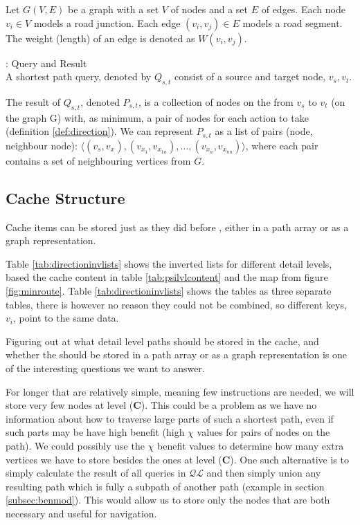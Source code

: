 \begin{definition}
Let $G(V, E)$ be a graph with a set $V$ of nodes and a set $E$ of edges.
Each node $v_i \in V$ models a road junction. Each edge $(v_i, v_j) \in
E$ models a road segment. The weight (length) of an edge is denoted as $W(v_i, v_j)$.
\end{definition}


\begin{definition}{\spathns: Query and Result}\\
A shortest path query, denoted by $Q_{s,t}$ consist of a source and target node, $v_s,v_t$.

The result of $Q_{s,t}$, denoted $P_{s,t}$, is a collection of nodes on the \spath from $v_s$ to $v_t$ (on the graph G) with, as minimum, a pair of nodes for each action to take (definition \ref{def:direction}).
We can represent $P_{s,t}$ as a list of pairs (node, neighbour node): $\langle (v_{s},v_{x_{}}), (v_{x_1},v_{x_{1n}}), \dots ,(v_{x_n},v_{x_{nn}}) \rangle$, where each pair contains a set of neighbouring vertices from $G$.
\end{definition}




\subsection{Cache Structure}

Cache items can be stored just as they did before \cite{thomsen2012}, either in a path array or as a graph representation. 

Table \ref{tab:directioninvlists} shows the inverted lists for different detail levels, based the cache content in table \ref{tab:psilvlcontent} and the map from figure \ref{fig:minroute}. Table \ref{tab:directioninvlists} shows the tables as three separate tables, there is however no reason they could not be combined, so different keys, $v_i$, point to the same data.

Figuring out at what detail level paths should be stored in the cache, and whether the should be stored in a path array or as a graph representation is one of the interesting questions we want to answer. 

For longer \spaths that are relatively simple, meaning few instructions are needed, we will store very few nodes at level (\textbf{C}). This could be a problem as we have no information about how to traverse large parts of such a shortest path, even if such parts may be have high benefit (high $\chi$ values for pairs of nodes on the path). We could possibly use the $\chi$ benefit values to determine how many extra vertices we have to store besides the ones at level (\textbf{C}). One such alternative is to simply calculate the result of all queries in $\mathcal{QL}$ and then simply union any resulting path which is fully a subpath of another path (example in section \ref{subsec:benmod}). This would allow us to store only the nodes that are both necessary and useful for navigation.


